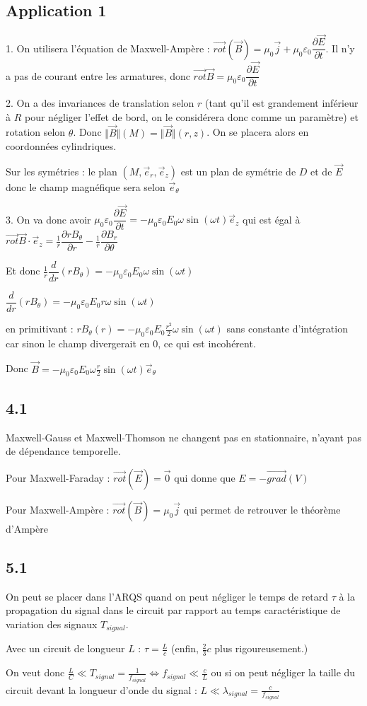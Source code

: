 \documentclass[a4paper,12pt]{book}
\begin{document}
\subsection{Application 1}
1. On utilisera l'équation de Maxwell-Ampère : $\vec{rot}(\vec{B})=\mu_0\vec{j} + \mu_0\varepsilon_0\dfrac{\partial\vec{E}}{\partial t}$. Il n'y a pas de courant entre les armatures, donc $\vec{rot}\vec{B}=\mu_0\varepsilon_0\dfrac{\partial\vec{E}}{\partial t}$
\par 2. On a des invariances de translation selon $r$ (tant qu'il est grandement inférieur à $R$ pour négliger l'effet de bord, on le considérera donc comme un paramètre) et rotation selon $\theta$. Donc $\Vert \vec{B}\Vert(M)=\Vert\vec{B}\Vert(r,z)$. On se placera alors en coordonnées cylindriques.
\par Sur les symétries : le plan $(M,\vec{e}_r,\vec{e}_z)$ est un plan de symétrie de $D$ et de $\vec{E}$ donc le champ magnéfique sera selon $\vec{e}_\theta$
\par 3. On va donc avoir $\mu_0\varepsilon_0\dfrac{\partial\vec{E}}{\partial t}= -\mu_0\varepsilon_0E_0\omega\sin(\omega t)\vec{e}_z$ qui est égal à $\vec{rot}\vec{B}\cdot\vec{e}_z=\frac{1}{r}\dfrac{\partial rB_\theta}{\partial r} - \frac{1}{r}\dfrac{\partial B_r}{\partial \theta}$
\par Et donc $\frac{1}{r}\dfrac{d}{dr}(rB_\theta)=-\mu_0\varepsilon_0E_0\omega\sin(\omega t)$ \par $\dfrac{d}{dr}(rB_\theta)=-\mu_0\varepsilon_0E_0r\omega\sin(\omega t)$ \par en primitivant : $rB_\theta(r) = -\mu_0\varepsilon_0E_0\frac{r^2}{2}\omega\sin(\omega t)$ sans constante d'intégration car sinon le champ divergerait en $0$, ce qui est incohérent.
\par Donc $\vec{B}=-\mu_0\varepsilon_0E_0\omega\frac{r}{2}\sin(\omega t)\vec{e}_\theta$

\subsection{4.1}
Maxwell-Gauss et Maxwell-Thomson ne changent pas en stationnaire, n'ayant pas de dépendance temporelle.
\par Pour Maxwell-Faraday : $\vec{rot}(\vec{E})=\vec{0}$ qui donne que $E=-\vec{grad}(V)$
\par Pour Maxwell-Ampère : $\vec{rot}(\vec{B})=\mu_0\vec{j}$ qui permet de retrouver le théorème d'Ampère

\subsection{5.1}
On peut se placer dans l'ARQS quand on peut négliger le temps de retard $\tau$ à la propagation du signal dans le circuit par rapport au temps caractéristique de variation des signaux $T_{signal}$.
\par Avec un circuit de longueur $L$ : $\tau= \frac{L}{c}$ (enfin, $\frac{2}{3}c$ plus rigoureusement.) \par On veut donc $\frac{L}{C}\ll T_{signal}=\frac{1}{f_{signal}}\Leftrightarrow f_{signal}\ll \frac{c}{L}$ ou si on peut négliger la taille du circuit devant la longueur d'onde du signal : $L\ll \lambda_{signal}=\frac{c}{f_{signal}}$
\end{document}
